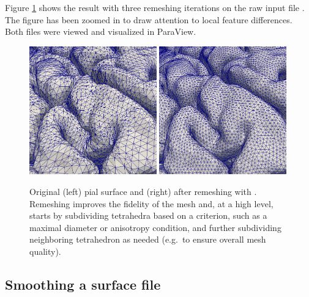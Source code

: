 Figure \ref{fig:chp3:ernie-remesh} shows the result
 with three remeshing iterations on the raw
input file . The figure has been zoomed in to draw
attention to local feature differences. Both files were viewed
and visualized in ParaView.
\begin{figure}
  \centering
  \includegraphics[width=0.49\textwidth]{./graphics/chp3/raw-stlmesh.png}
  \includegraphics[width=0.49\textwidth]{./graphics/chp3/remesh-stlmesh.png}
  \caption{Original (left) pial surface and (right) after remeshing
    with \svmtk{}. Remeshing improves the fidelity of the mesh and, at
    a high level, starts by subdividing tetrahedra based on a
    criterion, such as a maximal diameter or anisotropy condition, and
    further subdividing neighboring tetrahedron as needed (e.g.~to
    ensure overall mesh quality).}
  \label{fig:chp3:ernie-remesh}
\end{figure}


\subsection{Smoothing a surface file}
\label{subsubsec:chp3:mesh-creation:smoothing}

